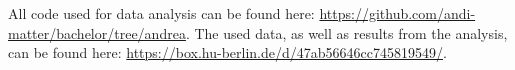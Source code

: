 

All code used for data analysis can be found here: \url{https://github.com/andi-matter/bachelor/tree/andrea}. The used data, as well as results from the analysis, can be found here: \url{https://box.hu-berlin.de/d/47ab56646cc745819549/}.
